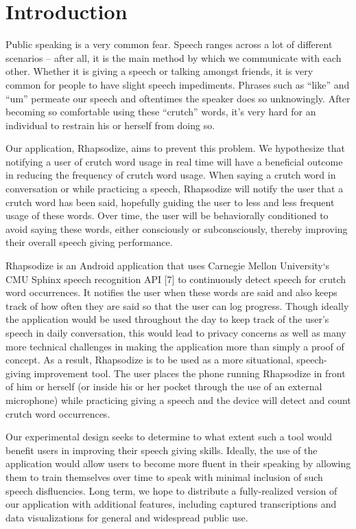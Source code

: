 \documentclass{sigchi}
\begin{document}

\section{Introduction}

Public speaking is a very common fear. Speech ranges across a lot of different scenarios -- after all, it is the main method by which we communicate with each other. Whether it is giving a speech or talking amongst friends, it is very common for people to have slight speech impediments. Phrases such as ``like'' and ``um'' permeate our speech and oftentimes the speaker does so unknowingly. After becoming so comfortable using these “crutch” words, it’s very hard for an individual to restrain his or herself from doing so.

Our application, Rhapsodize, aims to prevent this problem. We hypothesize that notifying a user of crutch word usage in real time will have a beneficial outcome in reducing the frequency of crutch word usage. When saying a crutch word in conversation or while practicing a speech, Rhapsodize will notify the user that a crutch word has been said, hopefully guiding the user to less and less frequent usage of these words. Over time, the user will be behaviorally conditioned to avoid saying these words, either consciously or subconsciously, thereby improving their overall speech giving performance.

Rhapsodize is an Android application that uses Carnegie Mellon University`s CMU Sphinx speech recognition API [7] to continuously detect speech for crutch word occurrences. It notifies the user when these words are said and also keeps track of how often they are said so that the user can log progress. Though ideally the application would be used throughout the day to keep track of the user’s speech in daily conversation, this would lead to privacy concerns as well as many more technical challenges in making the application more than simply a proof of concept. As a result, Rhapsodize is to be used as a more situational, speech-giving improvement tool. The user places the phone running Rhapsodize in front of him or herself (or inside his or her pocket through the use of an external microphone) while practicing giving a speech and the device will detect and count crutch word occurrences. 

Our experimental design seeks to determine to what extent such a tool would benefit users in improving their speech giving skills. Ideally, the use of the application would allow users to become more fluent in their speaking by allowing them to train themselves over time to speak with minimal inclusion of such speech disfluencies. Long term, we hope to distribute a fully-realized version of our application with additional features, including captured transcriptions and data visualizations for general and widespread public use.
\end{document}
